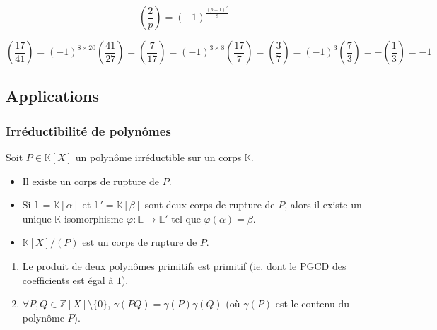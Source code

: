   \begin{proposition}
    \[ \left( \frac{2}{p} \right) = (-1)^{\frac{(p-1)^2}{8}} \]
  \end{proposition}

  \begin{example}
    \[ \left( \frac{17}{41} \right) = (-1)^{8 \times 20} \left( \frac{41}{27} \right) = \left( \frac{7}{17} \right) = (-1)^{3 \times 8} \left( \frac{17}{7} \right) = \left( \frac{3}{7} \right) = (-1)^{3} \left( \frac{7}{3} \right) = - \left( \frac{1}{3} \right) = -1 \]
  \end{example}

  \subsection{Applications}

  \subsubsection{Irréductibilité de polynômes}


  \begin{theorem}
    Soit $P \in \mathbb{K}[X]$ un polynôme irréductible sur un corps $\mathbb{K}$.
    \begin{itemize}
      \item Il existe un corps de rupture de $P$.
      \item Si $\mathbb{L} = \mathbb{K}[\alpha]$ et $\mathbb{L}' = \mathbb{K}[\beta]$ sont deux corps de rupture de $P$, alors il existe un unique $\mathbb{K}$-isomorphisme $\varphi : \mathbb{L} \rightarrow \mathbb{L}'$ tel que $\varphi(\alpha) = \beta$.
      \item $\mathbb{K}[X]/(P)$ est un corps de rupture de $P$.
    \end{itemize}
  \end{theorem}


  \begin{lemma}[Gauss]
    \begin{enumerate}[label=(\roman*)]
      \item Le produit de deux polynômes primitifs est primitif (ie. dont le PGCD des coefficients est égal à $1$).
      \item $\forall P, Q \in \mathbb{Z}[X] \setminus \{ 0 \}$, $\gamma(PQ) = \gamma(P) \gamma(Q)$ (où $\gamma(P)$ est le contenu du polynôme $P$).
    \end{enumerate}
  \end{lemma}

